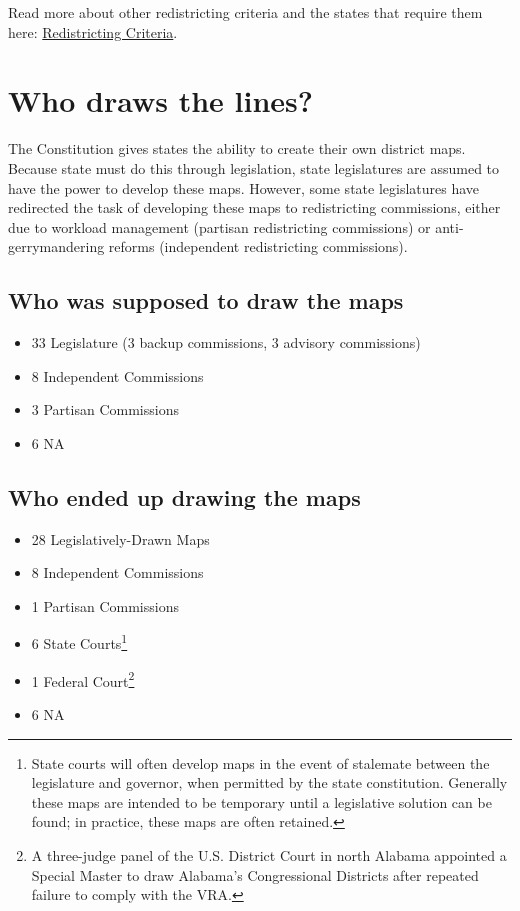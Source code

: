 \documentclass[10pt]{article}
\begin{document}
	\noindent Read more about other redistricting criteria and the states that require them here: \href{https://www.ncsl.org/elections-and-campaigns/2020-redistricting-criteria}{Redistricting Criteria}.
	
	\section{Who draws the lines?}
	
	The Constitution gives states the ability to create their own district maps. Because state must do this through legislation, state legislatures are assumed to have the power to develop these maps. However, some state legislatures have redirected the task of developing these maps to redistricting commissions, either due to workload management (partisan redistricting commissions) or anti-gerrymandering reforms (independent redistricting commissions). 
	
\subsection{Who was supposed to draw the maps}
\begin{itemize}
    \item 33 Legislature (3 backup commissions, 3 advisory commissions)
    \item 8 Independent Commissions
    \item 3 Partisan Commissions
    \item 6 NA
\end{itemize}
	
\subsection{Who ended up drawing the maps}
	\begin{itemize}
		\item 28 Legislatively-Drawn Maps
		\item 8 Independent Commissions
		\item 1 Partisan Commissions
		\item 6 State Courts\footnote{State courts will often develop maps in the event of stalemate between the legislature and governor, when permitted by the state constitution. Generally these maps are intended to be temporary until a legislative solution can be found; in practice, these maps are often retained.}
		\item 1 Federal Court\footnote{A three-judge panel of the U.S. District Court in north Alabama appointed a Special Master to draw Alabama's Congressional Districts after repeated failure to comply with the VRA.}
		\item 6 NA
	\end{itemize}
	
\end{document}
